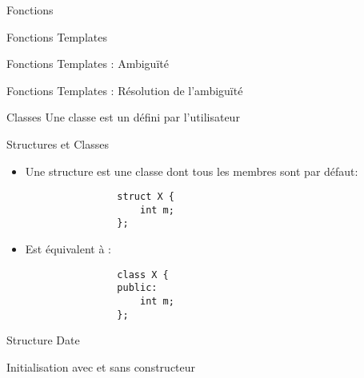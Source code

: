 \documentclass[handout]{beamer}
\let\emph\relax %
\begin{document}
\begin{frame}[fragile]{Fonctions}
    
\end{frame}

\begin{frame}[fragile]{Fonctions Templates}
    
\end{frame}

\begin{frame}[fragile]{Fonctions Templates : Ambiguïté}
    
\end{frame}

\begin{frame}[fragile]{Fonctions Templates : Résolution de l'ambiguïté}
    
\end{frame}

\begin{frame}[fragile]{Classes}
    Une classe est un \emph{type} défini par l'utilisateur
    
\end{frame}

\begin{frame}[fragile]{Structures et Classes}
    \begin{itemize}
        \item Une structure est une classe dont tous les membres sont \emph{publics} par défaut:
              \begin{lstlisting}
                struct X {
                    int m;
                };
              \end{lstlisting}
        \item Est équivalent à :
              \begin{lstlisting}
                class X {
                public:
                    int m;
                };
              \end{lstlisting}
    \end{itemize}
\end{frame}

\begin{frame}[fragile]{Structure Date}
    
\end{frame}

\begin{frame}[fragile]{Initialisation avec et sans constructeur}
    
\end{frame}
\end{document}
